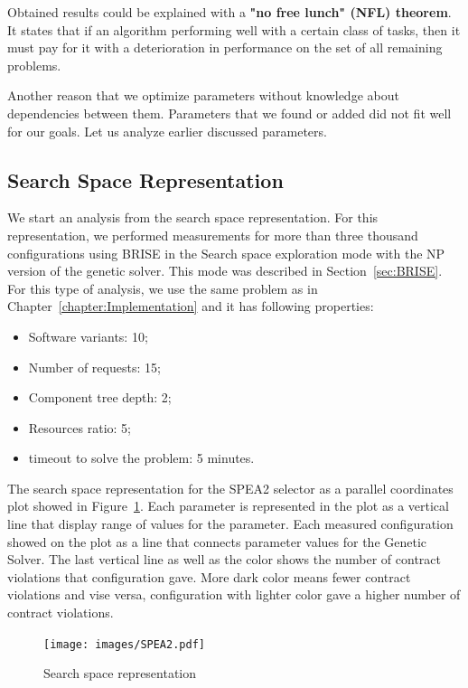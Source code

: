 Obtained results could be explained with a \textbf{"no free lunch" (NFL) theorem}\cite{wolpert1996, wolpert1997}. It states that if an algorithm performing well with a certain class of tasks, then it must pay for it with a deterioration in performance on the set of all remaining problems.

Another reason that we optimize parameters without knowledge about dependencies between them. Parameters that we found or added did not fit well for our goals. Let us analyze earlier discussed parameters.

\subsection{Search Space Representation}

We start an analysis from the search space representation. For this representation, we performed measurements for more than three thousand configurations using BRISE in the Search space exploration mode with the NP version of the genetic solver. This mode was described in Section~\ref{sec:BRISE}. For this type of analysis, we use the same problem as in Chapter~\ref{chapter:Implementation} and it has following properties:
\begin{itemize}
	\item Software variants: 10;
	\item Number of requests: 15;
	\item Component tree depth: 2;
	\item Resources ratio: 5;
	\item timeout to solve the problem: 5 minutes.
\end{itemize}

The search space representation for the SPEA2 selector as a parallel coordinates plot showed in Figure~\ref{fig:SearchSpaceViewFull}.
Each parameter is represented in the plot as a vertical line that display range of values for the parameter. Each measured configuration showed on the plot as a line that connects parameter values for the Genetic Solver. The last vertical line as well as the color shows the number of contract violations that configuration gave. More dark color means fewer contract violations and vise versa, configuration with lighter color gave a higher number of contract violations.

\begin{figure}
	\centering
	\texttt{[image: images/SPEA2.pdf]}
	\caption[Search space representation]{Search space representation}
	\label{fig:SearchSpaceViewFull}
\end{figure}

